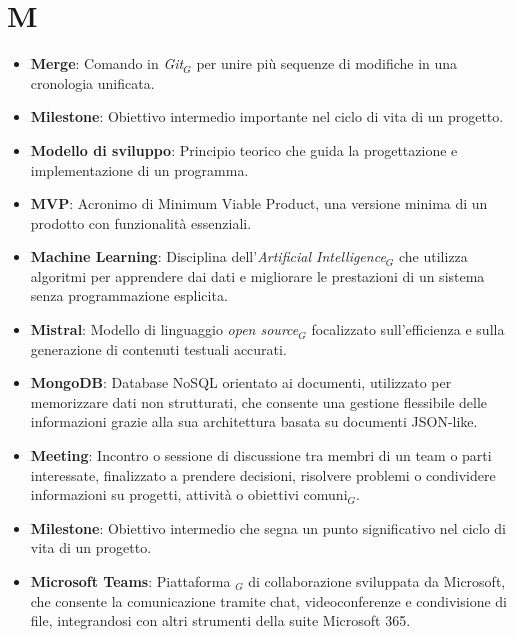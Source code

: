 \section{M}
\begin{itemize}
    \item \textbf{Merge}: Comando in \textit{Git}$_G$ per unire più sequenze di modifiche in una cronologia unificata.
    \item \textbf{Milestone}: Obiettivo intermedio importante nel ciclo di vita di un progetto.
    \item \textbf{Modello di sviluppo}: Principio teorico che guida la progettazione e implementazione di un programma.
    \item \textbf{MVP}: Acronimo di Minimum Viable Product, una versione minima di un prodotto con funzionalità essenziali.
    \item \textbf{Machine Learning}: Disciplina dell'\textit{Artificial Intelligence}$_G$ che utilizza algoritmi per apprendere dai dati e migliorare le prestazioni di un sistema senza programmazione esplicita.
    \item \textbf{Mistral}: Modello di linguaggio \textit{open source}$_G$ focalizzato sull'efficienza e sulla generazione di contenuti testuali accurati.
    \item \textbf{MongoDB}: Database NoSQL orientato ai documenti, utilizzato per memorizzare dati non strutturati, che consente una gestione flessibile delle informazioni grazie alla sua architettura basata su documenti JSON-like.
    \item \textbf{Meeting}: Incontro o sessione di discussione tra membri di un team o parti interessate, finalizzato a prendere decisioni, risolvere problemi o condividere informazioni su progetti, attività o obiettivi comuni$_G$.
    \item \textbf{Milestone}: Obiettivo intermedio che segna un punto significativo nel ciclo di vita di un progetto.
    \item \textbf{Microsoft Teams}: Piattaforma $_G$ di collaborazione sviluppata da Microsoft, che consente la comunicazione tramite chat, videoconferenze e condivisione di file, integrandosi con altri strumenti della suite Microsoft 365.
\end{itemize}
